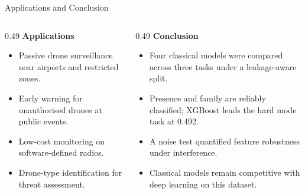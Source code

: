 \documentclass[aspectratio=169,11pt]{beamer}
\begin{document}
\begin{frame}{Applications and Conclusion}
\begin{columns}[t]
\begin{column}{0.49\textwidth}
\textbf{Applications}
\begin{itemize}\footnotesize
\item Passive drone surveillance near airports and restricted zones.
\item Early warning for unauthorised drones at public events.
\item Low-cost monitoring on software-defined radios.
\item Drone-type identification for threat assessment.
\end{itemize}
\end{column}
\begin{column}{0.49\textwidth}
\textbf{Conclusion}
\begin{itemize}\footnotesize
\item Four classical models were compared across three tasks under a
leakage-aware split.
\item Presence and family are reliably classified; XGBoost leads the hard mode
task at 0.492.
\item A noise test quantified feature robustness under interference.
\item Classical models remain competitive with deep learning on this dataset.
\end{itemize}
\end{column}
\end{columns}
\end{frame}
\end{document}
